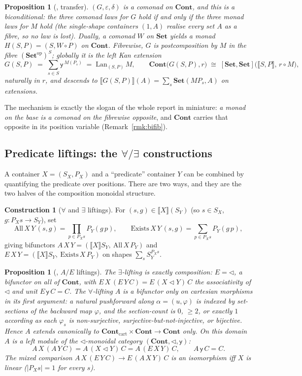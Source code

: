 \documentclass[11pt]{amsart}
\theoremstyle{plain}
\newtheorem{proposition}[theorem]{Proposition}
\theoremstyle{definition}
\newtheorem{construction}[theorem]{Construction}
\theoremstyle{remark}
\newcommand{\Set}{\mathbf{Set}}
\newcommand{\Cont}{\mathbf{Cont}}
\newcommand{\op}{\mathrm{op}}
\newcommand{\ext}[1]{\llbracket #1 \rrbracket}
\newcommand{\tri}{\triangleleft}
\newcommand{\y}{\mathsf{y}}
\begin{document}
\begin{proposition}[\cite{MacBethCodensity}, transfer]\label{prop:transfer}
$(G,\varepsilon,\delta)$ is a comonad on $\Cont$, and this is a biconditional: the three comonad laws
for $G$ hold if and only if the three monad laws for $M$ hold (the single-shape containers $(1,A)$
realise every set $A$ as a fibre, so no law is lost). Dually, a comonad $W$ on $\Set$ yields a monad
$H(S,P)=(S,W\circ P)$ on $\Cont$. Fibrewise, $G$ is postcomposition by $M$ in the fibre
$(\Set^{\op})^S$; globally it is the left Kan extension
\[
  G(S,P) \;=\; \sum_{s\in S} \y^{\,M(P_s)} \;=\; \mathrm{Lan}_{(S,P)}\,M,
  \qquad
  \Cont\big(G(S,P),r\big)\;\cong\;[\Set,\Set]\big(\ext{S,P},\,r\circ M\big),
\]
naturally in $r$, and descends to $\ext{G(S,P)}(A)=\sum_s \Set(MP_s, A)$ on extensions.
\end{proposition}

The mechanism is exactly the slogan of the whole report in miniature: \emph{a monad on the base is a
comonad on the fibrewise opposite}, and $\Cont$ carries that opposite in its position variable
(Remark~\ref{rmk:bifib}).

\subsection{Predicate liftings: the $\forall/\exists$ constructions}\label{ssec:liftings}
A container $X=(S_X,P_X)$ and a ``predicate'' container $Y$ can be combined by quantifying the
predicate over positions. There are two ways, and they are the two halves of the composition monoidal
structure.

\begin{construction}[$\forall$ and $\exists$ liftings]\label{con:liftings}
For $(s,g)\in\ext{X}(S_Y)$ (so $s\in S_X$, $g\colon P_X s\to S_Y$), set
\[
  \mathrm{All}\,X\,Y\,(s,g)=\textstyle\prod_{p\in P_X s}P_Y(g\,p),
  \qquad
  \mathrm{Exists}\,X\,Y\,(s,g)=\textstyle\sum_{p\in P_X s}P_Y(g\,p),
\]
giving bifunctors $A\,X\,Y=(\ext{X}S_Y,\ \mathrm{All}\,X\,P_Y)$ and
$E\,X\,Y=(\ext{X}S_Y,\ \mathrm{Exists}\,X\,P_Y)$ on shapes $\sum_s S_Y^{P_X s}$.
\end{construction}

\begin{proposition}[\cite{MacBethCodensity}, $A/E$ liftings]\label{prop:liftings}
The $\exists$-lifting is exactly composition: $E = \tri$, a bifunctor on all of $\Cont$, with
$E\,X\,(E\,Y\,C)=E\,(X\tri Y)\,C$ the associativity of $\tri$ and unit $E\,\y\,C=C$. The
$\forall$-lifting $A$ is a bifunctor only on \emph{cartesian} morphisms in its first argument: a
natural pushforward along $\alpha=(u,\varphi)$ is indexed by set-sections of the backward map
$\varphi$, and the section-count is $0$, $\ge 2$, or exactly $1$ according as each $\varphi_s$ is
non-surjective, surjective-but-not-injective, or bijective. Hence $A$ extends canonically to
$\Cont_{\mathrm{cart}}\times\Cont\to\Cont$ only. On this domain $A$ is a left module of the
$\tri$-monoidal category $(\Cont,\tri,\y)$:
\[
  A\,X\,(A\,Y\,C)=A\,(X\tri Y)\,C=A\,(E\,X\,Y)\,C,\qquad A\,\y\,C=C.
\]
The mixed comparison $A\,X\,(E\,Y\,C)\to E\,(A\,X\,Y)\,C$ is an isomorphism iff $X$ is \emph{linear}
($|P_X s|=1$ for every $s$).
\end{proposition}
\end{document}
